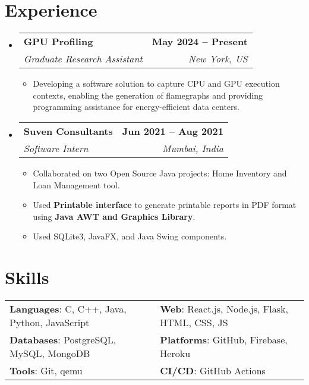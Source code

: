 \documentclass[letterpaper,11pt]{article}
\makeatletter
\newcommand{\resumeItem}[1]{
  \item\small{
    {#1 \vspace{-2pt}}
  }
}
\newcommand{\resumeSubheading}[4]{
  \vspace{-2pt}\item
    \begin{tabular*}{1.0\textwidth}[t]{l@{\extracolsep{\fill}}r}
      \vspace{-2pt}\textbf{#1} & \textbf{\small #2} \\
      \textit{\small#3} & \textit{\small #4} \\
    \end{tabular*}\vspace{-7pt}
}
\newcommand{\resumeSubHeadingListStart}{\begin{itemize}[leftmargin=0.0in, label={}]}
\newcommand{\resumeSubHeadingListEnd}{\end{itemize}}
\newcommand{\resumeItemListStart}{\begin{itemize}}
\newcommand{\resumeItemListEnd}{\end{itemize}\vspace{-5pt}}
\makeatother
\begin{document}
\section{Experience}
    \resumeSubHeadingListStart
    \vspace{-2pt}

            \resumeSubheading
            {GPU Profiling}{May 2024 -- Present}
            {Graduate Research Assistant}{New York, US}
            \resumeItemListStart
                \resumeItem{Developing a software solution to capture CPU and GPU execution contexts, enabling the generation of flamegraphs and providing programming assistance for energy-efficient data centers.}
            \resumeItemListEnd
        \vspace{-3pt}
        
        \resumeSubheading
            {Suven Consultants}{Jun 2021 -- Aug 2021}
            {Software Intern}{Mumbai, India}
            \resumeItemListStart
                \resumeItem{Collaborated on two Open Source Java projects: Home Inventory and Loan Management tool.}
                \resumeItem{Used \textbf{Printable interface} to generate printable reports in PDF format using \textbf{Java AWT and Graphics Library}.}
                \resumeItem{Used SQLite3, JavaFX, and Java Swing components.}
            \resumeItemListEnd
        \vspace{-3pt}
    \resumeSubHeadingListEnd
\vspace{-15pt}



\section{Skills}
    \vspace{-4pt}
    \begin{itemize}[leftmargin=0.2in, label={}]
        {\item{
            \begin{tabular}{ l@{\hskip 0.2in} l }
                 \textbf{Languages}: C, C++, Java, Python, JavaScript & \textbf{Web}: React.js, Node.js, Flask, HTML, CSS, JS  \\ 
                 \textbf{Databases}: PostgreSQL, MySQL, MongoDB & \textbf{Platforms}: GitHub, Firebase, Heroku \\  
                 \textbf{Tools}: Git, qemu & \textbf{CI/CD}: GitHub Actions
            \end{tabular}
        }}
    \end{itemize}
\vspace{-15pt}
\end{document}
